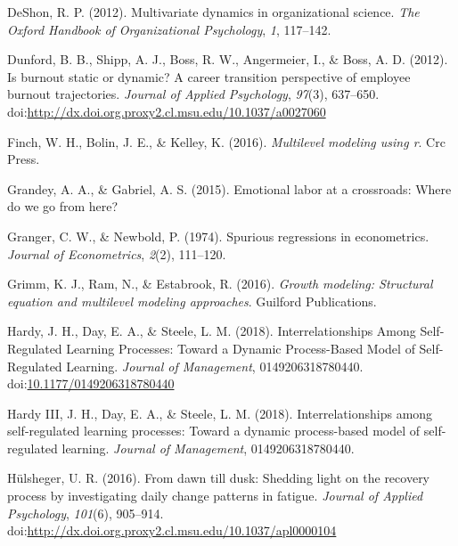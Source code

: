 \documentclass[english,,man]{apa6}
\theoremstyle{definition}
\theoremstyle{definition}
\theoremstyle{definition}
\theoremstyle{remark}
\begin{document}
\leavevmode\hypertarget{ref-deshon_multivariate_2012}{}%
DeShon, R. P. (2012). Multivariate dynamics in organizational science.
\emph{The Oxford Handbook of Organizational Psychology}, \emph{1},
117--142.

\leavevmode\hypertarget{ref-dunford_is_2012}{}%
Dunford, B. B., Shipp, A. J., Boss, R. W., Angermeier, I., \& Boss, A.
D. (2012). Is burnout static or dynamic? A career transition perspective
of employee burnout trajectories. \emph{Journal of Applied Psychology},
\emph{97}(3), 637--650.
doi:\href{https://doi.org/http://dx.doi.org.proxy2.cl.msu.edu/10.1037/a0027060}{http://dx.doi.org.proxy2.cl.msu.edu/10.1037/a0027060}

\leavevmode\hypertarget{ref-finch2016multilevel}{}%
Finch, W. H., Bolin, J. E., \& Kelley, K. (2016). \emph{Multilevel
modeling using r}. Crc Press.

\leavevmode\hypertarget{ref-grandey2015emotional}{}%
Grandey, A. A., \& Gabriel, A. S. (2015). Emotional labor at a
crossroads: Where do we go from here?

\leavevmode\hypertarget{ref-granger_spurious_1974}{}%
Granger, C. W., \& Newbold, P. (1974). Spurious regressions in
econometrics. \emph{Journal of Econometrics}, \emph{2}(2), 111--120.

\leavevmode\hypertarget{ref-grimm_growth_2016}{}%
Grimm, K. J., Ram, N., \& Estabrook, R. (2016). \emph{Growth modeling:
Structural equation and multilevel modeling approaches}. Guilford
Publications.

\leavevmode\hypertarget{ref-hardy_interrelationships_2018}{}%
Hardy, J. H., Day, E. A., \& Steele, L. M. (2018). Interrelationships
Among Self-Regulated Learning Processes: Toward a Dynamic Process-Based
Model of Self-Regulated Learning. \emph{Journal of Management},
0149206318780440.
doi:\href{https://doi.org/10.1177/0149206318780440}{10.1177/0149206318780440}

\leavevmode\hypertarget{ref-hardy2018}{}%
Hardy III, J. H., Day, E. A., \& Steele, L. M. (2018).
Interrelationships among self-regulated learning processes: Toward a
dynamic process-based model of self-regulated learning. \emph{Journal of
Management}, 0149206318780440.

\leavevmode\hypertarget{ref-hulsheger_dawn_2016}{}%
Hülsheger, U. R. (2016). From dawn till dusk: Shedding light on the
recovery process by investigating daily change patterns in fatigue.
\emph{Journal of Applied Psychology}, \emph{101}(6), 905--914.
doi:\href{https://doi.org/http://dx.doi.org.proxy2.cl.msu.edu/10.1037/apl0000104}{http://dx.doi.org.proxy2.cl.msu.edu/10.1037/apl0000104}
\end{document}

